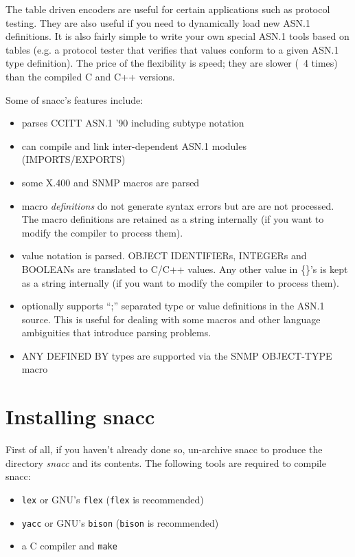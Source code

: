 The table driven encoders are useful for certain applications such as
protocol testing.  They are also useful if you need to dynamically
load new ASN.1 definitions.  It is also fairly simple to write your
own special ASN.1 tools based on tables (e.g. a protocol tester that
verifies that values conform to a given ASN.1 type definition).  The
price of the flexibility is speed; they are slower (~4 times) than the
compiled C and C++ versions.

Some of snacc's features include:
\begin {itemize}
\item {parses CCITT ASN.1 '90 including  subtype notation}
\item {can compile and link inter-dependent ASN.1 modules (IMPORTS/EXPORTS)}
\item {some X.400 and SNMP macros are parsed}

\item {macro {\em definitions} do not generate syntax errors but are
are not processed. The macro definitions are retained as a string
internally (if you want to modify the compiler to process them).}

\item {value notation is parsed. OBJECT IDENTIFIERs, INTEGERs
and BOOLEANs are translated to C/C++ values. Any other value in \{\}'s
is kept as a string internally (if you want to modify the compiler to
process them).}

\item {optionally supports ``;'' separated type or value definitions
      in the ASN.1 source. This is useful for dealing with some macros and
      other language ambiguities that introduce parsing problems.}
\item {ANY DEFINED BY types are supported via the SNMP OBJECT-TYPE macro}
\end{itemize}

\section{\label{old-install-section}Installing snacc}

First of all, if you haven't already done so, un-archive snacc to
produce the directory {\em snacc} and its contents.  The following tools
are required to compile snacc:
\begin{itemize}
\item {\verb$lex$ or GNU's \verb$flex$ (\verb$flex$ is recommended)}
\item {\verb$yacc$ or GNU's \verb$bison$ (\verb$bison$ is recommended)}
\item {a C compiler and \verb$make$}
\end{itemize}

